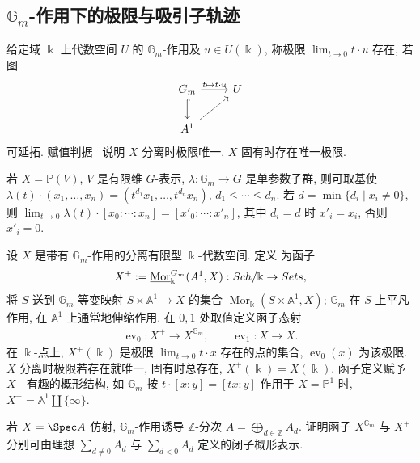 \subsection{\texorpdfstring{$\mathbb G_m$}{Gm}-作用下的极限与吸引子轨迹}\label{src:7.8.2-subsection}
\begin{definition}[极限]\label{src:7.8.4}
给定域 $\Bbbk$ 上代数空间 $U$ 的 $\mathbb G_m$-作用及 $u\in U(\Bbbk)$, 称极限 $\lim_{t\to0}t\cdot u$ 存在, 若图
\begin{align*}
\begin{tikzcd}[ampersand replacement=\&]
\mathbb G_m\arrow[r,"{t\mapsto t\cdot u}"]\arrow[d,hook]\&U\\
\mathbb A^1\arrow[ur,dashed]\&
\end{tikzcd}
\end{align*}
可延拓. 赋值判据~ 说明 $X$ 分离时极限唯一, $X$ 固有时存在唯一极限.
\end{definition}
\begin{example}\label{src:7.8.5}
若 $X=\mathbb P(V)$, $V$ 是有限维 $G$-表示, $\lambda:\mathbb G_m\to G$ 是单参数子群, 则可取基使 $\lambda(t)\cdot(x_1,\ldots,x_n)=(t^{d_1}x_1,\ldots,t^{d_n}x_n)$, $d_1\le\cdots\le d_n$. 若 $d=\min\{d_i\mid x_i\ne0\}$, 则 $\lim_{t\to0}\lambda(t)\cdot[x_0:\cdots:x_n]=[x'_0:\cdots:x'_n]$, 其中 $d_i=d$ 时 $x'_i=x_i$, 否则 $x'_i=0$.
\end{example}
\begin{definition}[吸引子轨迹]\label{src:7.8.6}
设 $X$ 是带有 $\mathbb G_m$-作用的分离有限型 $\Bbbk$-代数空间. 定义 为函子
\begin{align*}
X^+:=\underline{\operatorname{Mor}}_{\Bbbk}^{G_m}(A^1,X):Sch/\Bbbk\to Sets,
\end{align*}
将 $S$ 送到 $\mathbb G_m$-等变映射 $S\times\mathbb A^1\to X$ 的集合 $\operatorname{Mor}_{\Bbbk}(S\times\mathbb A^1,X)$; $\mathbb G_m$ 在 $S$ 上平凡作用, 在 $\mathbb A^1$ 上通常地伸缩作用. 在 $0,1$ 处取值定义函子态射
\begin{align*}
\operatorname{ev}_0:X^+\to X^{\mathbb G_m},\qquad\operatorname{ev}_1:X\to X.
\end{align*}
在 $\Bbbk$-点上, $X^+(\Bbbk)$ 是极限 $\lim_{t\to0}t\cdot x$ 存在的点的集合, $\operatorname{ev}_0(x)$ 为该极限. $X$ 分离时极限若存在就唯一, 固有时总存在, $X^+(\Bbbk)=X(\Bbbk)$. 函子定义赋予 $X^+$ 有趣的概形结构, 如 $\mathbb G_m$ 按 $t\cdot[x:y]=[tx:y]$ 作用于 $X=\mathbb P^1$ 时, $X^+=\mathbb A^1\amalg\{\infty\}$.
\end{definition}
\begin{exercise}[仿射情形]\label{src:7.8.7}
若 $X=\Spec A$ 仿射, $\mathbb G_m$-作用诱导 $\mathbb Z$-分次 $A=\bigoplus_{d\in\mathbb Z}A_d$. 证明函子 $X^{\mathbb G_m}$ 与 $X^+$ 分别可由理想 $\sum_{d\ne0}A_d$ 与 $\sum_{d<0}A_d$ 定义的闭子概形表示.
\end{exercise}
